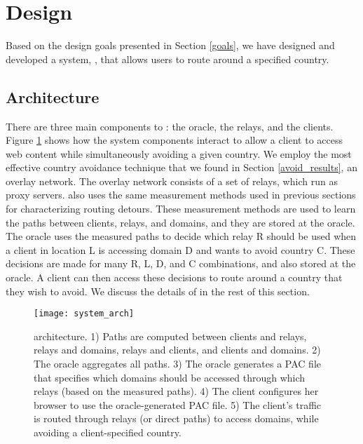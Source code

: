\section{Design}
\label{system_design}
Based on the design goals presented in Section \ref{goals}, we have designed 
and developed a system, \system{}, that allows users to route around a specified 
country.

\subsection{Architecture}

There are three main components to \system{}: the oracle, the relays, and the 
clients.  Figure \ref{fig:arch} shows how the system components
interact to allow a client to access web content while simultaneously avoiding 
a given country.  We employ the most effective country avoidance technique that 
we found in Section \ref{avoid_results}, an overlay network.  The overlay network 
consists of a set of relays, which run as proxy servers.  \system{} also uses 
the same measurement methods used in previous sections for characterizing routing 
detours.  These measurement methods are used to learn the paths between clients, 
relays, and domains, and they are stored at the oracle.  The oracle uses the 
measured paths to decide which relay R should be used when a client in location L 
is accessing domain D and wants to avoid country C.  These decisions are made 
for many R, L, D, and C combinations, and also stored at the oracle.  A 
client can then access these decisions to route around a country that they wish 
to avoid.  We discuss the details of \system{} in the rest of this section.

\begin{figure}[t]
\centering
\texttt{[image: system\_arch]}
\caption{\system{} architecture. 1) Paths are computed between clients and relays, 
relays and domains, relays and clients, and clients and domains.  2) The oracle 
aggregates all paths.  3)  The oracle generates a PAC file that specifies which 
domains should be accessed through which relays (based on the measured paths).  
4) The client configures her browser to use the oracle-generated PAC file.  5) 
The client's traffic is routed through relays (or direct paths) to access domains, 
while avoiding a client-specified country.}
\label{fig:arch}
\end{figure}

